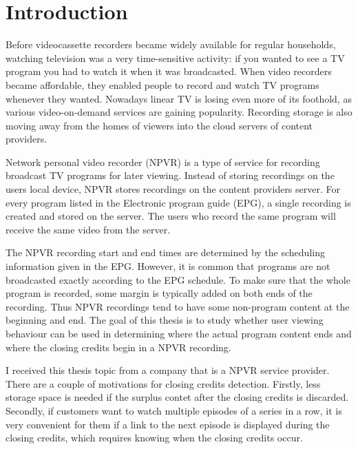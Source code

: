 \section{Introduction} \label{sec:intro}

Before videocassette recorders became widely available for regular households, watching television was a very time-sensitive activity: if you wanted to see a TV program you had to watch it when it was broadcasted. When video recorders became affordable, they enabled people to record and watch TV programs whenever they wanted. Nowadays linear TV is losing even more of its foothold, as various video-on-demand services are gaining popularity. Recording storage is also moving away from the homes of viewers into the cloud servers of content providers.

Network personal video recorder (NPVR) is a type of service for recording broadcast TV programs for later viewing. Instead of storing recordings on the users local device, NPVR stores recordings on the content providers server. For every program listed in the Electronic program guide (EPG), a single recording is created and stored on the server. The users who record the same program will receive the same video from the server.

The NPVR recording start and end times are determined by the scheduling information given in the EPG. However, it is common that programs are not broadcasted exactly according to the EPG schedule. To make sure that the whole program is recorded, some margin is typically added on both ends of the recording. Thus NPVR recordings tend to have some non-program content at the beginning and end. The goal of this thesis is to study whether user viewing behaviour can be used in determining where the actual program content ends and where the closing credits begin in a NPVR recording.

I received this thesis topic from a company that is a NPVR service provider. There are a couple of motivations for closing credits detection. Firstly, less storage space is needed if the surplus contet after the closing credits is discarded. Secondly, if customers want to watch multiple episodes of a series in a row, it is very convenient for them if a link to the next episode is displayed during the closing credits, which requires knowing when the closing credits occur.

